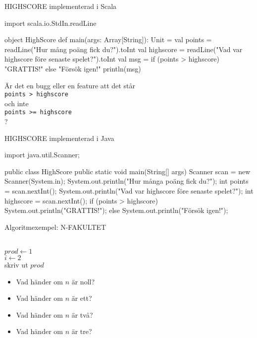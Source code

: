 \begin{Slide}{HIGHSCORE implementerad i Scala}
\begin{Code}
import scala.io.StdIn.readLine

object HighScore {
  def main(args: Array[String]): Unit = {
    val points = readLine("Hur mång poäng fick du?").toInt
    val highscore = readLine("Vad var highscore före senaste spelet?").toInt
    val msg = if (points > highscore) "GRATTIS!" else "Försök igen!"
    println(msg) 
  }
}
\end{Code}
\pause
Är det en bugg eller en feature att det står\\ \texttt{points > highscore} \\ och inte \\ \texttt{points >= highscore} \\ ?
\end{Slide}


\begin{Slide}{HIGHSCORE implementerad i Java}
\begin{Code}[language=Java]
import java.util.Scanner;

public class HighScore {
    public static void main(String[] args){
        Scanner scan = new Scanner(System.in);
        System.out.println("Hur många poäng fick du?");
        int points =  scan.nextInt();
        System.out.println("Vad var highscore före senaste spelet?");
        int highscore = scan.nextInt();
        if (points > highscore) {
            System.out.println("GRATTIS!");
        } else {
            System.out.println("Försök igen!");
        }
    }
}
\end{Code}
\end{Slide}


\begin{Slide}{Algoritmexempel: N-FAKULTET}
\begin{algorithm}[H]

 ~\\
 $prod \leftarrow 1$ \\
 $i \leftarrow 2$  \\
 skriv ut $prod$
\end{algorithm}
\pause\vspace{1em}
\begin{itemize}\SlideFontSmall
\item Vad händer om $n$ är noll?
\item Vad händer om $n$ är ett?
\item Vad händer om $n$ är två?
\item Vad händer om $n$ är tre?
\end{itemize}
\end{Slide}

